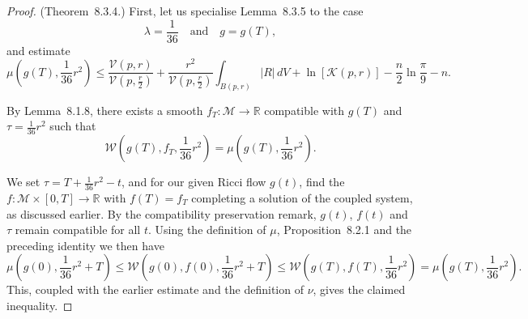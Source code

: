 \begin{proof}
(Theorem~8.3.4.) First, let us specialise Lemma~8.3.5 to the case
\[
\lambda = \frac{1}{36}\quad\text{and}\quad g=g(T),
\]
and estimate
\[
\mu\!\left(g(T),\frac{1}{36}r^2\right)
\le \frac{\mathcal V(p,r)}{\mathcal V(p,\frac{r}{2})}
+\frac{r^2}{\mathcal V(p,\frac{r}{2})}\int_{B(p,r)} |R|\,dV
+\ln[\mathcal K(p,r)]-\frac{n}{2}\ln\frac{\pi}{9}-n.
\]

By Lemma~8.1.8, there exists a smooth $f_T : \mathcal M \to \mathbb R$
compatible with $g(T)$ and $\tau=\frac{1}{36}r^2$ such that
\[
\mathcal W\!\left(g(T),f_T,\frac{1}{36}r^2\right)
=\mu\!\left(g(T),\frac{1}{36}r^2\right).
\]

We set $\tau = T + \frac{1}{36}r^2 - t$, and for our given Ricci flow $g(t)$,
find the $f : \mathcal M\times[0,T] \to \mathbb R$ with $f(T)=f_T$
completing a solution of the coupled system, as discussed earlier. By the
compatibility preservation remark, $g(t)$, $f(t)$ and $\tau$ remain compatible
for all $t$. Using the definition of $\mu$, Proposition~8.2.1 and the
preceding identity we then have
\[
\mu\!\left(g(0),\frac{1}{36}r^2+T\right)
\le \mathcal W\!\left(g(0),f(0),\frac{1}{36}r^2+T\right)
 \le \mathcal W\!\left(g(T),f(T),\frac{1}{36}r^2\right)
= \mu\!\left(g(T),\frac{1}{36}r^2\right).
\]
This, coupled with the earlier estimate and the definition of $\nu$, gives the
claimed inequality.
\end{proof}

